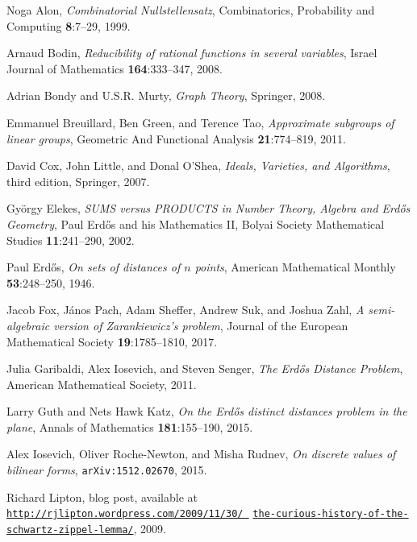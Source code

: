 \documentclass{daj}
\theoremstyle{definition}
\begin{document}

\begin{thebibliography}{99}

Noga Alon,
\emph{Combinatorial Nullstellensatz},
Combinatorics, Probability and Computing {\bf 8}:7--29, 1999.

Arnaud Bodin, 
\emph{Reducibility of rational functions in several variables},
Israel Journal of Mathematics {\bf 164}:333--347, 2008.

Adrian Bondy and U.S.R. Murty,
\emph{Graph Theory},
Springer, 2008.

Emmanuel Breuillard, Ben Green, and Terence Tao,
\emph{Approximate subgroups of linear groups},
Geometric And Functional Analysis {\bf 21}:774--819, 2011.

 David Cox, John Little, and Donal O'Shea,
\emph{Ideals, Varieties, and Algorithms}, third edition, Springer, 2007.

Gy\"orgy Elekes,
\emph{SUMS versus PRODUCTS in Number Theory, Algebra and Erd\H os Geometry},
Paul Erd\H os and his Mathematics II, 
Bolyai Society Mathematical Studies {\bf 11}:241--290, 2002.

Paul Erd\H os,
\emph{On sets of distances of $n$ points},
American Mathematical Monthly {\bf 53}:248--250, 1946.

Jacob Fox, J\'anos Pach, Adam Sheffer, Andrew Suk, and Joshua Zahl,
\emph{A semi-algebraic version of Zarankiewicz's problem},
Journal of the European Mathematical Society {\bf 19}:1785--1810, 2017.

Julia Garibaldi, Alex Iosevich, and Steven Senger,
\emph{The Erd\H os Distance Problem},
American Mathematical Society, 2011.

Larry Guth and Nets Hawk Katz,
\emph{On the Erd{\H o}s distinct distances problem in the plane},
Annals of Mathematics {\bf 181}:155--190, 2015.

Alex Iosevich, Oliver Roche-Newton, and Misha Rudnev,
\emph{On discrete values of bilinear forms},
{\tt arXiv:1512.02670}, 2015.

Richard Lipton,
blog post, available at \href{http://rjlipton.wordpress.com/2009/11/30/the-curious-history-of-the-schwartz-zippel-lemma/}{\tt http://rjlipton.wordpress.com/2009/11/30/~} \href{http://rjlipton.wordpress.com/2009/11/30/the-curious-history-of-the-schwartz-zippel-lemma}{\tt the-curious-history-of-the-schwartz-zippel-lemma/}, 2009.




\end{thebibliography}
\end{document}
